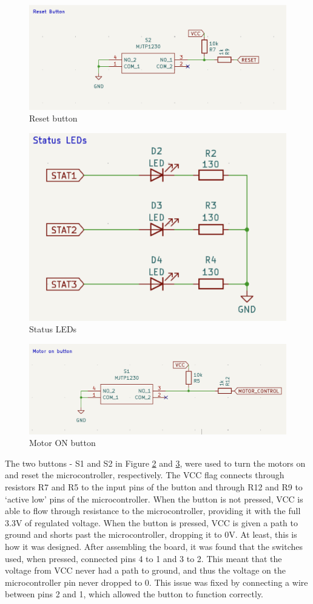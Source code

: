 \begin{figure}[H]
    \centering
    \includegraphics[width=0.5\linewidth]{REPORT/Reset.png}
    \caption{Reset button}
    \label{fig:RSET}
\end{figure}

\begin{figure}[H]
    \centering
    \includegraphics[width=0.35\linewidth]{REPORT/LED.png}
    \caption{Status LEDs}
    \label{fig:led}
\end{figure}

\begin{figure}[H]
    \centering
    \includegraphics[width=0.6\linewidth]{REPORT/MotorON.png}
    \caption{Motor ON button}
    \label{fig:Motor ON}
\end{figure}

The two buttons - S1 and S2 in Figure \ref{fig:led} and \ref{fig:Motor ON}, were used to turn the motors on and reset the microcontroller, respectively. The VCC flag connects through resistors R7 and R5 to the input pins of the button and through R12 and R9 to ‘active low’ pins of the microcontroller. When the button is not pressed, VCC is able to flow through resistance to the microcontroller, providing it with the full 3.3V of regulated voltage. When the button is pressed, VCC is given a path to ground and shorts past the microcontroller, dropping it to 0V. At least, this is how it was designed. After assembling the board, it was found that the switches used, when pressed, connected pins 4 to 1 and 3 to 2. This meant that the voltage from VCC never had a path to ground, and thus the voltage on the microcontroller pin never dropped to 0. This issue was fixed by connecting a wire between pins 2 and 1, which allowed the button to function correctly. 
\\

